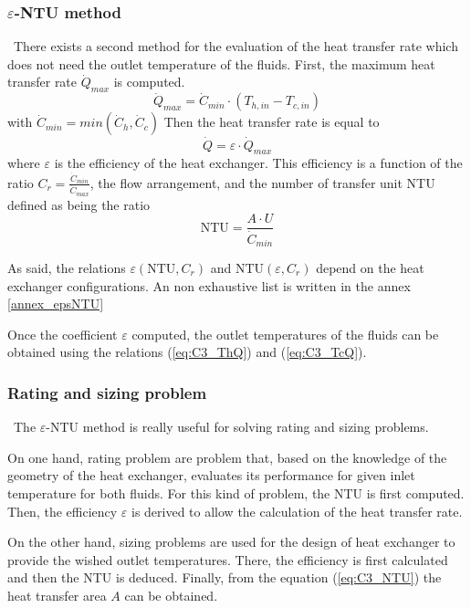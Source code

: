 \subsubsection{$\varepsilon$-NTU method}
\quad\, There exists a second method for the evaluation of the heat transfer rate which does not need the outlet temperature of the fluids. First, the maximum heat transfer rate $\dot{Q}_{max}$ is computed.
\begin{equation}
\dot{Q}_{max} = \dot{C}_{min}\cdot (T_{h,in} - T_{c,in})
\end{equation}
with $\dot{C}_{min}=min(\dot{C}_h,\dot{C}_c)$
Then the heat transfer rate is equal to 
\begin{equation}
\dot{Q} = \varepsilon\cdot\dot{Q}_{max}
\end{equation}
where $\varepsilon$ is the efficiency of the heat exchanger. This efficiency is a function of the ratio $C_r = \frac{\dot{C}_{min}}{\dot{C}_{max}}$, the flow arrangement, and the number of transfer unit NTU defined as being the ratio
\begin{equation}
\text{NTU} = \frac{A\cdot U}{\dot{C}_{min}}\label{eq:C3_NTU}
\end{equation}

As said, the relations $\varepsilon(\text{NTU},C_r)$ and $\text{NTU}(\varepsilon,C_r)$ depend on the heat exchanger configurations. An non exhaustive list is written in the annex \ref{annex_epsNTU}\citep{GregoryNellis2015} 

Once the coefficient $\varepsilon$ computed, the outlet temperatures of the fluids can be obtained using the relations (\ref{eq:C3_ThQ}) and (\ref{eq:C3_TcQ}).

\subsubsection{Rating and sizing problem}
\quad\, The $\varepsilon$-NTU method is really useful for solving rating and sizing problems.

On one hand, rating problem are problem that, based on the knowledge of the geometry of the heat exchanger, evaluates its performance for given inlet temperature for both fluids. For this kind of problem, the NTU is first computed. Then, the efficiency $\varepsilon$ is derived to allow the calculation of the heat transfer rate.

On the other hand, sizing problems are used for the design of heat exchanger to provide the wished outlet temperatures. There, the efficiency is first calculated and then the NTU is deduced. Finally, from the equation (\ref{eq:C3_NTU}) the heat transfer area $A$ can be obtained\citep{Ngendakumana2018}.

